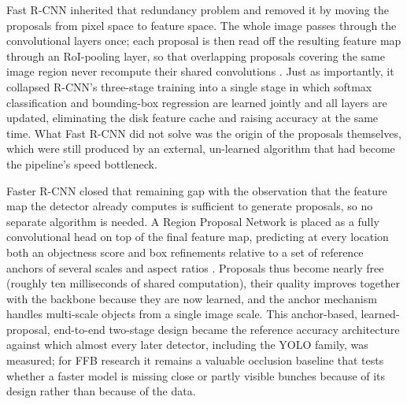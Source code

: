 Fast R-CNN inherited that redundancy problem and removed it by moving the proposals from pixel space to feature space. The whole image passes through the convolutional layers once; each proposal is then read off the resulting feature map through an RoI-pooling layer, so that overlapping proposals covering the same image region never recompute their shared convolutions \cite{girshick2015fastrcnn}. Just as importantly, it collapsed R-CNN's three-stage training into a single stage in which softmax classification and bounding-box regression are learned jointly and all layers are updated, eliminating the disk feature cache and raising accuracy at the same time. What Fast R-CNN did not solve was the origin of the proposals themselves, which were still produced by an external, un-learned algorithm that had become the pipeline's speed bottleneck.

Faster R-CNN closed that remaining gap with the observation that the feature map the detector already computes is sufficient to generate proposals, so no separate algorithm is needed. A Region Proposal Network is placed as a fully convolutional head on top of the final feature map, predicting at every location both an objectness score and box refinements relative to a set of reference anchors of several scales and aspect ratios \cite{ren2017fasterrcnn}. Proposals thus become nearly free (roughly ten milliseconds of shared computation), their quality improves together with the backbone because they are now learned, and the anchor mechanism handles multi-scale objects from a single image scale. This anchor-based, learned-proposal, end-to-end two-stage design became the reference accuracy architecture against which almost every later detector, including the YOLO family, was measured; for FFB research it remains a valuable occlusion baseline that tests whether a faster model is missing close or partly visible bunches because of its design rather than because of the data.

